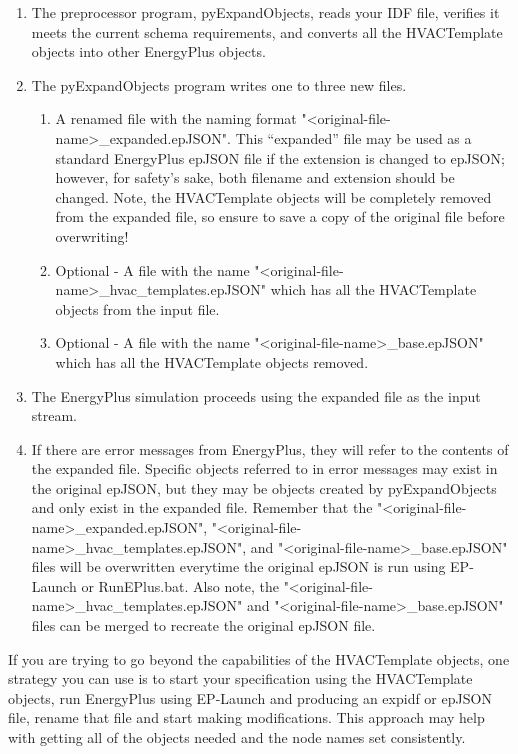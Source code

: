 \begin{enumerate}
\def\labelenumi{\arabic{enumi})}
\item
  The preprocessor program, pyExpandObjects, reads your IDF file, verifies it meets the current schema requirements, and converts all the HVACTemplate objects into other EnergyPlus objects.
\item
  The pyExpandObjects program writes one to three new files.  
  \begin{enumerate}
  \item
    A renamed file with the naming format "<original-file-name>\_expanded.epJSON". This “expanded” file may be used as a standard EnergyPlus epJSON file if the extension is changed to epJSON; however, for safety’s sake, both filename and extension should be changed.  Note, the HVACTemplate objects will be completely removed from the expanded file, so ensure to save a copy of the original file before overwriting!
  \item
    Optional - A file with the name "<original-file-name>\_hvac\_templates.epJSON" which has all the HVACTemplate objects from the input file.
  \item
    Optional - A file with the name "<original-file-name>\_base.epJSON" which has all the HVACTemplate objects removed.
  \end{enumerate}
  \item
    The EnergyPlus simulation proceeds using the expanded file as the input stream.
  \item
    If there are error messages from EnergyPlus, they will refer to the contents of the expanded file. Specific objects referred to in error messages may exist in the original epJSON, but they may be objects created by pyExpandObjects and only exist in the expanded file. Remember that the "<original-file-name>\_expanded.epJSON", "<original-file-name>\_hvac\_templates.epJSON", and "<original-file-name>\_base.epJSON" files will be overwritten everytime the original epJSON is run using EP-Launch or RunEPlus.bat.  Also note, the "<original-file-name>\_hvac\_templates.epJSON" and "<original-file-name>\_base.epJSON" files can be merged to recreate the original epJSON file.
\end{enumerate}

If you are trying to go beyond the capabilities of the HVACTemplate objects, one strategy you can use is to start your specification using the HVACTemplate objects, run EnergyPlus using EP-Launch and producing an expidf or epJSON file, rename that file and start making modifications. This approach may help with getting all of the objects needed and the node names set consistently.

